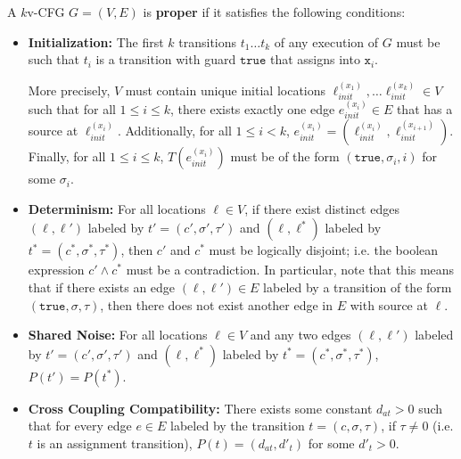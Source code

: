 \begin{defn}
    A $k$v-CFG $G = (V, E)$ is \textbf{proper} if it satisfies the following conditions: 
    \begin{itemize}
        \item \textbf{Initialization:} The first $k$ transitions $t_1\ldots t_k$ of any execution of $G$ must be such that $t_i$ is a transition with guard $\texttt{true}$ that assigns into $\texttt{x}_i$.
        
        More precisely, $V$ must contain unique initial locations $\ell_{init}^{(x_1)}, \ldots \ell_{init}^{(x_k)}\in V$ such that for all $1\leq i \leq k$, there exists exactly one edge $e_{init}^{(x_i)}\in E$ that has a source at $\ell_{init}^{(x_i)}$. Additionally, for all $1\leq i <k$, $e_{init}^{(x_i)} = (\ell_{init}^{(x_{i})}, \ell_{init}^{(x_{i+1})})$. Finally, for all $1\leq i \leq k$, $T(e_{init}^{(x_i)})$ must be of the form $(\texttt{true}, \sigma_i, i)$ for some $\sigma_i$.
        \item \textbf{Determinism:} For all locations $\ell\in V$, if there exist distinct edges $(\ell, \ell')$ labeled by $t'=(c', \sigma', \tau')$ and $(\ell, \ell^*)$ labeled by $t^* = (c^*, \sigma^*, \tau^*)$, then $c'$ and $c^*$ must be logically disjoint; i.e. the boolean expression $c' \land c^*$ must be a contradiction. 
        In particular, note that this means that if there exists an edge $(\ell, \ell')\in E$ labeled by a transition of the form $(\texttt{true}, \sigma, \tau)$, then there does not exist another edge in $E$ with source at $\ell$.
        \item \textbf{Shared Noise:} For all locations $\ell\in V$ and any two edges $(\ell, \ell')$ labeled by $t'=(c', \sigma', \tau')$ and $(\ell, \ell^*)$ labeled by $t^* = (c^*, \sigma^*, \tau^*)$, $P(t') = P(t^*)$. 
        \item \textbf{Cross Coupling Compatibility:} There exists some constant $d_{at}>0$ such that for every edge $e\in E$ labeled by the transition $t = (c, \sigma, \tau)$, if $\tau \neq 0$ (i.e. $t$ is an assignment transition), $P(t) = (d_{at}, d'_t)$ for some $d'_t >0$.
    \end{itemize}
\end{defn}

